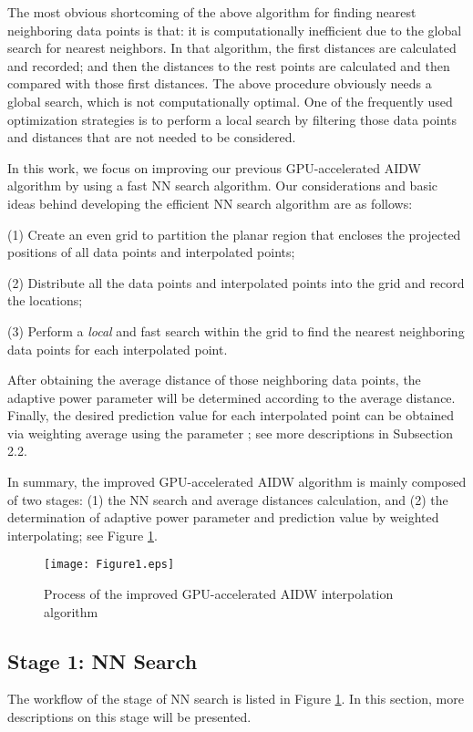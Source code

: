 \documentclass[final,5p,times,twocolumn,authoryear]{elsarticle}
\begin{document}
			The most obvious shortcoming of the above algorithm for finding nearest 
			neighboring data points is that: it is computationally inefficient due to 
			the global search for nearest neighbors. In that algorithm, the first  
			distances are calculated and recorded; and then the distances to the rest 
			points are calculated and then compared with those first  distances. The 
			above procedure obviously needs a global search, which is not 
			computationally optimal. One of the frequently used optimization strategies 
			is to perform a local search by filtering those data points and distances 
			that are not needed to be considered. 
			
			In this work, we focus on improving our previous GPU-accelerated AIDW 
			algorithm by using a fast NN search algorithm. Our considerations and basic 
			ideas behind developing the efficient NN search algorithm are as follows: 
			
			(1) Create an even grid to partition the planar region that encloses the 
			projected positions of all data points and interpolated points;
			
			(2) Distribute all the data points and interpolated points into the grid and 
			record the locations;
			
			(3) Perform a \textit{local} and fast search within the grid to find the nearest 
			neighboring data points for each interpolated point.
			
			After obtaining the average distance of those neighboring data points, the 
			adaptive power parameter  will be determined according to the 
			average distance. Finally, the desired prediction value for each 
			interpolated point can be obtained via weighting average using the parameter 
			; see more descriptions in Subsection 2.2.
			
			In summary, the improved GPU-accelerated AIDW algorithm is mainly composed of
			two stages: (1) the NN search and average distances calculation, and (2) the 
			determination of adaptive power parameter and prediction value by weighted 
			interpolating; see Figure \ref{fig1}.
			
			\begin{figure}[ht]
				\centering
				\texttt{[image: Figure1.eps]}
				\caption{Process of the improved GPU-accelerated AIDW interpolation algorithm}
				\label{fig1}
			\end{figure}
			
			\subsection{Stage 1: NN Search}
			The workflow of the stage of NN search is listed in Figure \ref{fig1}. In this 
			section, more descriptions on this stage will be presented.
			
\end{document}
